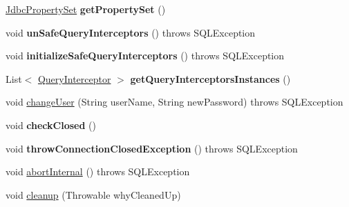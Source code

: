 \begin{DoxyCompactItemize}
\mbox{\label{classcom_1_1mysql_1_1cj_1_1jdbc_1_1_connection_impl_a46dbc5cd68d7e3bd2ba1931c4bd5f003}} 
\mbox{\hyperlink{interfacecom_1_1mysql_1_1cj_1_1jdbc_1_1_jdbc_property_set}{Jdbc\+Property\+Set}} {\bfseries get\+Property\+Set} ()
\item 
\mbox{\label{classcom_1_1mysql_1_1cj_1_1jdbc_1_1_connection_impl_a2d9f577e4a6ccc254081ce8dfd9a3bd8}} 
void {\bfseries un\+Safe\+Query\+Interceptors} ()  throws S\+Q\+L\+Exception 
\item 
\mbox{\label{classcom_1_1mysql_1_1cj_1_1jdbc_1_1_connection_impl_a0f81e64aaf07263998dc13d5455e7513}} 
void {\bfseries initialize\+Safe\+Query\+Interceptors} ()  throws S\+Q\+L\+Exception 
\item 
\mbox{\label{classcom_1_1mysql_1_1cj_1_1jdbc_1_1_connection_impl_ac2c88b4ff05ae8dbed8e5ce3e79ad423}} 
List$<$ \mbox{\hyperlink{interfacecom_1_1mysql_1_1cj_1_1interceptors_1_1_query_interceptor}{Query\+Interceptor}} $>$ {\bfseries get\+Query\+Interceptors\+Instances} ()
\item 
void \mbox{\hyperlink{classcom_1_1mysql_1_1cj_1_1jdbc_1_1_connection_impl_a124604d3aae705d3e14bc1deb6a3f9a9}{change\+User}} (String user\+Name, String new\+Password)  throws S\+Q\+L\+Exception 
\item 
\mbox{\label{classcom_1_1mysql_1_1cj_1_1jdbc_1_1_connection_impl_a33d9303b2ac912fc285f5c2215d568d1}} 
void {\bfseries check\+Closed} ()
\item 
\mbox{\label{classcom_1_1mysql_1_1cj_1_1jdbc_1_1_connection_impl_a65ad37d81e0865583f7896c058f7eb9f}} 
void {\bfseries throw\+Connection\+Closed\+Exception} ()  throws S\+Q\+L\+Exception 
\item 
void \mbox{\hyperlink{classcom_1_1mysql_1_1cj_1_1jdbc_1_1_connection_impl_a39a1f63273b1ccd8e4baf30f1f6955a9}{abort\+Internal}} ()  throws S\+Q\+L\+Exception 
\item 
void \mbox{\hyperlink{classcom_1_1mysql_1_1cj_1_1jdbc_1_1_connection_impl_ac72cb58dc4f2b002b1882b69815cc64b}{cleanup}} (Throwable why\+Cleaned\+Up)

\end{DoxyCompactItemize}
